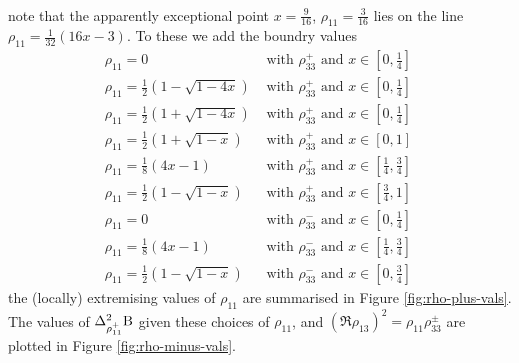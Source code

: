 \begin{subappendices}
\begin{subequations}
\begin{align}
\end{align}
\end{subequations}
note that the apparently exceptional point $x = \frac{9}{16}$, $\rho_{11} = \frac{3}{16}$ lies on the line $\rho_{11} = \frac{1}{32} \left(16 x-3 \right)$. To these we add the boundry values
\begin{subequations}
\label{eqn:rho11-con}
\begin{align}
  \label{eqn:rho-plus-con-1}\rho_{11} = 0 &\text{ with } \rho_{33}^+ \text{ and } x\in\left[0,\frac{1}{4}\right]\\
  \label{eqn:rho-plus-con-2}\rho_{11} = \frac{1}{2}\left(1-\sqrt{1-4x}\right) &\text{ with } \rho_{33}^+ \text{ and } x\in\left[0,\frac{1}{4}\right]\\
  \label{eqn:rho-plus-con-3}\rho_{11} = \frac{1}{2}\left(1+\sqrt{1-4x}\right) &\text{ with } \rho_{33}^+ \text{ and } x\in\left[0,\frac{1}{4}\right]\\
  \label{eqn:rho-plus-con-4}\rho_{11} = \frac{1}{2}\left(1+\sqrt{1-x}\right) &\text{ with } \rho_{33}^+ \text{ and } x\in\left[0,1\right]\\
  \label{eqn:rho-plus-con-5}\rho_{11} = \frac{1}{8}\left(4x-1\right) &\text{ with } \rho_{33}^+ \text{ and } x\in\left[\frac{1}{4},\frac{3}{4}\right]\\  
  \label{eqn:rho-plus-con-6}\rho_{11} = \frac{1}{2}\left(1-\sqrt{1-x}\right) &\text{ with } \rho_{33}^+ \text{ and } x\in\left[\frac{3}{4},1\right]\\
  \label{eqn:rho-minus-con-1}\rho_{11} = 0  &\text{ with } \rho_{33}^- \text{ and } x\in\left[0,\frac{1}{4}\right]\\
  \label{eqn:rho-minus-con-2}\rho_{11} = \frac{1}{8}(4x-1)  &\text{ with } \rho_{33}^- \text{ and } x\in\left[\frac{1}{4},\frac{3}{4}\right]\\
  \label{eqn:rho-minus-con-3}\rho_{11}= \frac{1}{2}(1-\sqrt{1-x}) &\text{ with } \rho_{33}^- \text{ and } x\in\left[0,\frac{3}{4}\right]\
\end{align}
\end{subequations}
the (locally) extremising values of $\rho_{11}$ are summarised in Figure \ref{fig:rho-plus-vals}. The values of $\var[\rho_{11}^+]{\opb}$ given these choices of $\rho_{11}$, and $\left(\Re{\rho_{13}}\right)^2 = \rho_{11}\rho_{33}^\pm$ are plotted in Figure \ref{fig:rho-minus-vals}.
\begin{figure}[ht]\centering
  \begin{subfigure}[t]{0.4\textwidth}

\end{subfigure}
\end{figure}
\end{subappendices}
